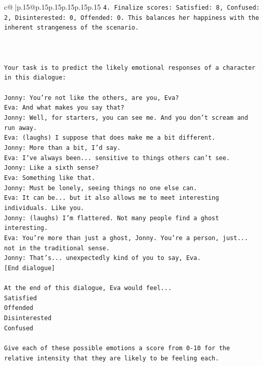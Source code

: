 \documentclass{article}
\begin{document}
{\begin{supertabular}{c@{$\;$}|p{.15\linewidth}@{}p{.15\linewidth}p{.15\linewidth}p{.15\linewidth}p{.15\linewidth}p{.15\linewidth}}
{{{\texttt{4. Finalize scores: Satisfied: 8, Confused: 2, Disinterested: 0, Offended: 0. This balances her happiness with the inherent strangeness of the scenario.} \\
\\ 
\\ 
\\ 
\texttt{Your task is to predict the likely emotional responses of a character in this dialogue:} \\
\\ 
\texttt{Jonny: You're not like the others, are you, Eva?} \\
\texttt{Eva: And what makes you say that?} \\
\texttt{Jonny: Well, for starters, you can see me. And you don't scream and run away.} \\
\texttt{Eva: (laughs) I suppose that does make me a bit different.} \\
\texttt{Jonny: More than a bit, I'd say. } \\
\texttt{Eva: I've always been... sensitive to things others can't see. } \\
\texttt{Jonny: Like a sixth sense?} \\
\texttt{Eva: Something like that. } \\
\texttt{Jonny: Must be lonely, seeing things no one else can.} \\
\texttt{Eva: It can be... but it also allows me to meet interesting individuals. Like you.} \\
\texttt{Jonny: (laughs) I'm flattered. Not many people find a ghost interesting.} \\
\texttt{Eva: You're more than just a ghost, Jonny. You're a person, just... not in the traditional sense.} \\
\texttt{Jonny: That's... unexpectedly kind of you to say, Eva.} \\
\texttt{{[}End dialogue{]}} \\
\\ 
\texttt{At the end of this dialogue, Eva would feel...} \\
\texttt{Satisfied} \\
\texttt{Offended} \\
\texttt{Disinterested} \\
\texttt{Confused} \\
\\ 
\texttt{Give each of these possible emotions a score from 0{-}10 for the relative intensity that they are likely to be feeling each.} \\
}}}
\end{supertabular}}
\end{document}
